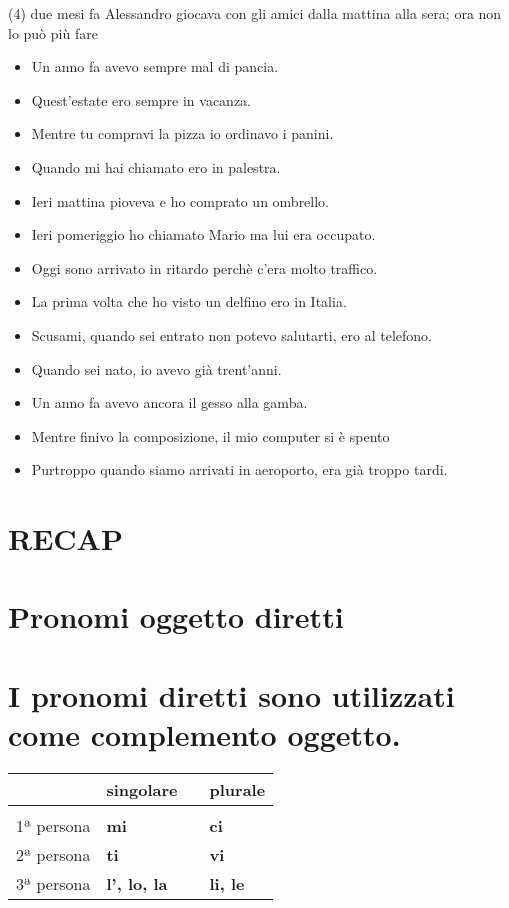 \documentclass[letter,11pt]{article}
\begin{document}
\noindent (4) due mesi fa Alessandro giocava con gli amici dalla mattina alla sera; ora non lo può più fare


\begin{multicols}{2}
\begin{itemize}
    \item Un anno fa avevo sempre mal di pancia.
    \item Quest'estate ero sempre in vacanza.
    \item Mentre tu compravi la pizza io ordinavo i panini.
    \item Quando mi hai chiamato ero in palestra.
    \item Ieri mattina pioveva e ho comprato un ombrello.
    \item Ieri pomeriggio ho chiamato Mario ma lui era occupato.
    \item Oggi sono arrivato in ritardo perchè c'era molto traffico.
    \item La prima volta che ho visto un delfino ero in Italia.
    \item Scusami, quando sei entrato non potevo salutarti, ero al telefono.
    \item Quando sei nato, io avevo già trent'anni.
    \item Un anno fa avevo ancora il gesso alla gamba.
    \item Mentre finivo la composizione, il mio computer si è spento
    \item Purtroppo quando siamo arrivati in aeroporto, era già troppo tardi.

\end{itemize}
\end{multicols}

\vskip 0.2in

\section*{RECAP}

\vskip 0.2in
\section*{Pronomi oggetto diretti}
\section*{I pronomi diretti sono utilizzati come complemento oggetto.}
\vskip 0.2in

\begin{tabular}{ |p{3cm}| p{2cm}| p{0.2cm}| p{2cm}| }
      & singolare  &    &   plurale  \\
    \hline
    \hline
     &  &      &  \\ \hline
    1ª persona & {\bf mi}   &   &  {\bf ci}  \\ \hline
    2ª persona & {\bf ti}   &   &  {\bf vi}  \\ \hline
    3ª persona & {\bf l', lo, la}   &   &  {\bf li, le}  \\ \hline
    \hline
\end{tabular}
\end{document}
